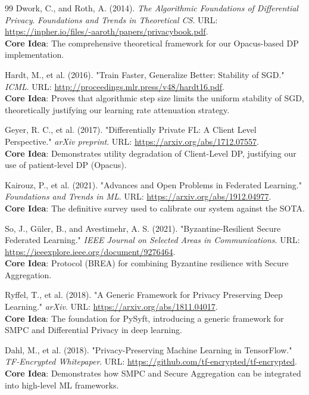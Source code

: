 \documentclass[10pt, a4paper, twocolumn]{article}
\begin{document}
\begin{thebibliography}{99}
 Dwork, C., and Roth, A. (2014). \textit{The Algorithmic Foundations of Differential Privacy}. \textit{Foundations and Trends in Theoretical CS}. URL: \url{https://inpher.io/files/-aaroth/papers/privacybook.pdf}. \\
\textbf{Core Idea}: The comprehensive theoretical framework for our Opacus-based DP implementation.

 Hardt, M., et al. (2016). "Train Faster, Generalize Better: Stability of SGD." \textit{ICML}. URL: \url{http://proceedings.mlr.press/v48/hardt16.pdf}. \\
\textbf{Core Idea}: Proves that algorithmic step size limits the uniform stability of SGD, theoretically justifying our learning rate attenuation strategy.

 Geyer, R. C., et al. (2017). "Differentially Private FL: A Client Level Perspective." \textit{arXiv preprint}. URL: \url{https://arxiv.org/abs/1712.07557}. \\
\textbf{Core Idea}: Demonstrates utility degradation of Client-Level DP, justifying our use of patient-level DP (Opacus).

 Kairouz, P., et al. (2021). "Advances and Open Problems in Federated Learning." \textit{Foundations and Trends in ML}. URL: \url{https://arxiv.org/abs/1912.04977}. \\
\textbf{Core Idea}: The definitive survey used to calibrate our system against the SOTA.

 So, J., Güler, B., and Avestimehr, A. S. (2021). "Byzantine‑Resilient Secure Federated Learning." \textit{IEEE Journal on Selected Areas in Communications}. URL: \url{https://ieeexplore.ieee.org/document/9276464}. \\
\textbf{Core Idea}: Protocol (BREA) for combining Byzantine resilience with Secure Aggregation.

 Ryffel, T., et al. (2018). "A Generic Framework for Privacy Preserving Deep Learning." \textit{arXiv}. URL: \url{https://arxiv.org/abs/1811.04017}. \\ 
\textbf{Core Idea}: The foundation for PySyft, introducing a generic framework for SMPC and Differential Privacy in deep learning.

 Dahl, M., et al. (2018). "Privacy-Preserving Machine Learning in TensorFlow." \textit{TF-Encrypted Whitepaper}. URL: \url{https://github.com/tf-encrypted/tf-encrypted}. \\ 
\textbf{Core Idea}: Demonstrates how SMPC and Secure Aggregation can be integrated into high-level ML frameworks.


\end{thebibliography}
\end{document}
